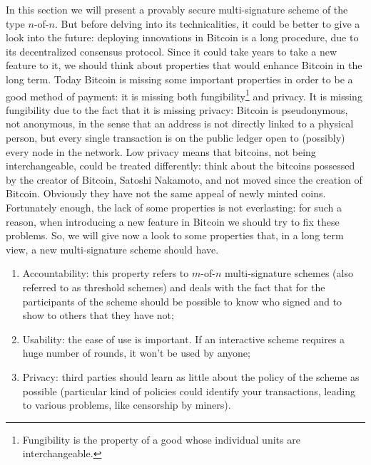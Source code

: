 \bigskip
\noindent
In this section we will present a provably secure multi-signature scheme of the type $n$-of-$n$. But before delving into its technicalities, it could be better to give a look into the future: deploying innovations in Bitcoin is a long procedure, due to its decentralized consensus protocol. Since it could take years to take a new feature to it, we should think about properties that would enhance Bitcoin in the long term. Today Bitcoin is missing some important properties in order to be a good method of payment: it is missing both fungibility\footnote{Fungibility is the property of a good whose individual units are interchangeable.} and privacy. It is missing fungibility due to the fact that it is missing privacy: Bitcoin is pseudonymous, not anonymous, in the sense that an address is not directly linked to a physical person, but every single transaction is on the public  ledger open to (possibly) every node in the network. Low privacy means that bitcoins, not being interchangeable, could be treated differently: think about the bitcoins possessed by the creator of Bitcoin, Satoshi Nakamoto, and not moved since the creation of Bitcoin. Obviously they have not the same appeal of newly minted coins.
\\
Fortunately enough, the lack of some properties is not everlasting: for such a reason, when introducing a new feature in Bitcoin we should try to fix these problems. So, we will give now a look to some properties that, in a long term view, a new multi-signature scheme should have.
\begin{enumerate}
	\item Accountability: this property refers to $m$-of-$n$ multi-signature schemes (also referred to as threshold schemes) and deals with the fact that for the participants of the scheme should be possible to know who signed and to show to others that they have not;
	\item Usability: the ease of use is important. If an interactive scheme requires a huge number of rounds, it won't be used by anyone;
	\item Privacy: third parties should learn as little about the policy of the scheme as possible (particular kind of policies could identify your transactions, leading to various problems, like censorship by miners).
\end{enumerate}

